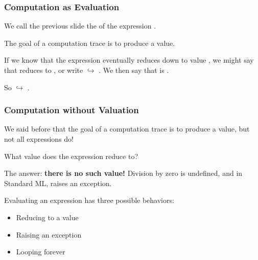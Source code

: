 \documentclass[aspectratio=169, handout]{beamer}
\begin{document}
\begin{frame}[fragile]
  \frametitle{Computation as Evaluation}

  We call the previous slide the  of the expression . \\

  \vspace{5pt}

  The goal of a computation trace is to produce a value.

  \pause
  \vspace{\fill}

  If we know that the expression  eventually reduces down to value , we might
  say that  reduces to , or write  $\hookrightarrow$ . We then say
  that  is .

  \vspace{5pt}

  So  $\hookrightarrow$ .

\end{frame}

\begin{frame}[fragile]
  \frametitle{Computation without Valuation}

  We said before that the goal of a computation trace is to produce a value, but not
  all expressions do!

  \pause
  \vspace{\fill}

  What value does the expression  reduce to?

  \pause
  \vspace{\fill}

  The answer: \textbf{there is no such value!} Division by zero is undefined, and in
  Standard ML, raises an exception.

  \pause
  \vspace{\fill}

  Evaluating an expression has three possible behaviors:
  \begin{itemize}
    \item Reducing to a value
    \item Raising an exception
    \item Looping forever
  \end{itemize}
\end{frame}
\end{document}
